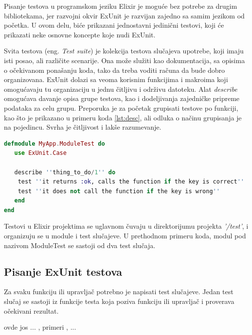 \documentclass[12pt,oneside]{memoir}
\begin{document}
\par Pisanje testova u programskom jeziku Elixir je moguće bez potrebe za drugim bibliotekama, jer razvojni okvir ExUnit je razvijan zajedno sa samim jezikom od početka. U ovom delu, biće prikazani jednostavni jedinični testovi, koji će prikazati neke osnovne koncepte koje nudi ExUnit. 

\par Svita testova (eng. \emph{Test suite}) je kolekcija testova slučajeva upotrebe, koji imaju isti posao, ali različite scenarije. Ona može služiti kao dokumentacija, sa opisima o očekivanom ponašanju koda, tako da treba voditi računa da bude dobro organizovana. ExUnit dolazi sa veoma korisnim funkcijima i makroima koji omogućavaju tu organizaciju u jednu čitljivu i održivu  datoteku. Alat \emph{describe } omogućava davanje opisa grupe testova, kao i dodeljivanja zajedničke pripreme podataka za celu grupu. Preporuka je za početak grupisati testove po funkciji, kao što je prikazano u primeru koda \ref{lst:desc}, ali odluka o načinu grupisanja je na pojedincu. Svrha je čitljivost i lakše razumevanje. 

\begin{lstlisting}[language=elixir, caption={Opisivanje testova unutar jedne grupe},captionpos=b, label={lst:desc}]
defmodule MyApp.ModuleTest do 
   use ExUnit.Case 
   
   describe ''thing_to_do/1'' do
   	test ''it returns :ok, calls the function if the key is correct''
   	test ''it does not call the function if the key is wrong''
   end
end
\end{lstlisting}

\par Testovi u Elixir projektima se uglavnom čuvaju u direktorijumu projekta \textit{'/test'}, i organizuju se u module i test slučajeve. U prethodnom primeru koda, modul pod nazivom ModuleTest se sastoji od dva test slučaja. 

\subsection{Pisanje ExUnit testova}
\par Za svaku funkciju ili upravljač potrebno je napisati test slučajeve. Jedan test slučaj se sastoji iz funkcije testa koja poziva funkciju ili upravljač i proverava očekivani rezultat.  



\par ovde jos ... , primeri , ... 
\end{document}
